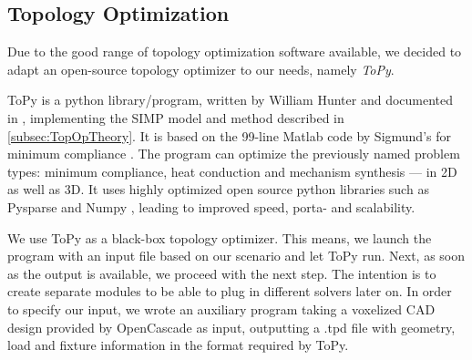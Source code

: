 \subsection{Topology Optimization}
\label{sec:ToPy}
Due to the good range of topology optimization software available, we decided to adapt an open-source topology optimizer to our needs, namely \emph{ToPy}.


ToPy \cite{ToPy} is a python library/program, written by William Hunter and documented in \cite{Hunter2009}, implementing the SIMP model and method described in \autoref{subsec:TopOpTheory}. It is based on the 99-line Matlab code by Sigmund's for minimum compliance \cite{sigmund200199}. The program can optimize the previously named problem types: minimum compliance, heat conduction and mechanism synthesis --- in 2D as well as 3D. It uses highly optimized open source python libraries such as Pysparse \cite{Pysparse} and Numpy \cite{Numpy}, leading to improved speed, porta- and scalability. %


We use ToPy as a black-box topology optimizer. This means, we launch the program with an input file based on our scenario and let ToPy run. Next, as soon as the output is available, we proceed with the next step. The intention is to create separate modules to be able to plug in different solvers later on. In order to specify our input, we wrote an auxiliary program taking a voxelized CAD design provided by OpenCascade as input, outputting a .tpd file with geometry, load and fixture information in the format required by ToPy. 

